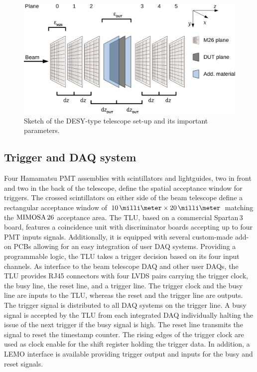 \begin{figure}[tb]
	\center
	\includegraphics[width=.9\textwidth]{figures/sketch_tscope4}
	\caption[Sketch of the DESY-type telescope set-up]{Sketch of the DESY-type telescope set-up and its important parameters.}
	\label{fig:datura_sketch}
\end{figure}

\subsection{Trigger and DAQ system}
\label{sec:tdaq}

Four Hamamatsu PMT assemblies with scintillators and lightguides, two in front and two in the back of the telescope, define the spatial acceptance window for triggers. 
The crossed scintillators on either side of the beam telescope define a rectangular acceptance window of $10\,\milli\meter \times 20\,\milli\meter$ matching the $\textrm{MIMOSA\,26}$ acceptance area. 
The TLU, based on a commercial Spartan\,3 board, features a coincidence unit with discriminator boards accepting up to four PMT inputs signals. 
Additionally, it is equipped with several custom-made add-on PCBs allowing for an easy integration of user DAQ systems. 
Providing a programmable logic, the TLU  takes a trigger decision based on its four input channels. 
As interface to the beam telescope DAQ and other user DAQs, the TLU provides RJ45 connectors with four LVDS pairs carrying the trigger clock, the busy line, the reset line, and a trigger line. 
The trigger clock and the busy line are inputs to the TLU, whereas the reset and the trigger line are outputs. 
The trigger signal is distributed to all DAQ systems on the trigger line. 
A busy signal is accepted by the TLU from each integrated DAQ individually halting the issue of the next trigger if the busy signal is high. 
The reset line transmits the signal to reset the timestamp counter.
The rising edges of the trigger clock are used as clock enable for the shift register holding the trigger data. 
In addition, a LEMO interface is available providing trigger output and inputs for the busy and reset signals.

